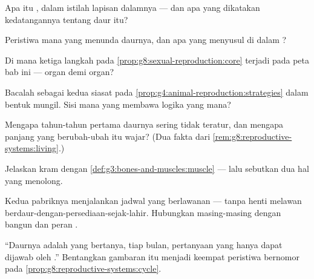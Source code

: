 \begin{exercise}[$\star$]\label{exo:g8:reproductive-systems:5}
Apa itu , dalam istilah lapisan dalamnya --- dan apa
yang dikatakan kedatangannya tentang daur itu?
\end{exercise}

\begin{exercise}[$\star$]\label{exo:g8:reproductive-systems:6}
Peristiwa mana yang menunda daurnya, dan apa yang menyusul
di dalam ?
\end{exercise}

\begin{exercise}[$\star\star$]\label{exo:g8:reproductive-systems:7}
Di mana ketiga langkah pada \cref{prop:g8:sexual-reproduction:core}
terjadi pada peta bab ini --- organ demi organ?
\end{exercise}

\begin{exercise}[$\star\star$]\label{exo:g8:reproductive-systems:8}
Bacalah  sebagai kedua siasat pada
\cref{prop:g4:animal-reproduction:strategies} dalam bentuk
mungil. Sisi mana yang membawa logika yang mana?
\end{exercise}

\begin{exercise}[$\star\star$]\label{exo:g8:reproductive-systems:9}
Mengapa tahun-tahun pertama daurnya sering tidak teratur,
dan mengapa panjang yang berubah-ubah itu wajar? (Dua fakta
dari \cref{rem:g8:reproductive-systems:living}.)
\end{exercise}

\begin{exercise}[$\star\star$]\label{exo:g8:reproductive-systems:10}
Jelaskan kram  dengan
\cref{def:g3:bones-and-muscles:muscle} --- lalu sebutkan dua
hal yang menolong.
\end{exercise}

\begin{exercise}[$\star\star$]\label{exo:g8:reproductive-systems:11}
Kedua pabriknya menjalankan jadwal yang berlawanan --- tanpa
henti melawan berdaur-dengan-persediaan-sejak-lahir.
Hubungkan masing-masing dengan bangun dan peran .
\end{exercise}

\begin{exercise}[$\star\star\star$]\label{exo:g8:reproductive-systems:12}
``Daurnya adalah  yang bertanya, tiap bulan, pertanyaan
yang hanya dapat dijawab oleh .'' Bentangkan
gambaran itu menjadi keempat peristiwa bernomor pada
\cref{prop:g8:reproductive-systems:cycle}.
\end{exercise}

